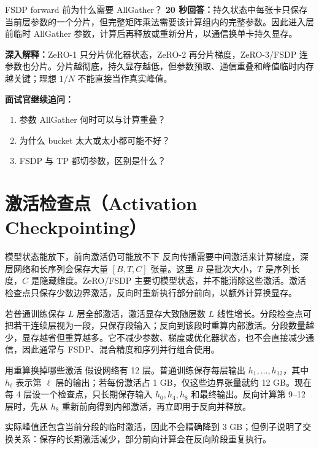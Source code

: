 \begin{interviewbox}{FSDP forward 前为什么需要 AllGather？}
\textbf{20 秒回答：}持久状态中每张卡只保存当前层参数的一个分片，但完整矩阵乘法需要该计算组内的完整参数。因此进入层前临时 AllGather 参数，计算后再释放或重新分片，以通信换单卡持久显存。

\textbf{深入解释：}ZeRO-1 只分片优化器状态，ZeRO-2 再分片梯度，ZeRO-3/FSDP 连参数也分片。分片越彻底，持久显存越低，但参数预取、通信重叠和峰值临时内存越关键；理想 $1/N$ 不能直接当作真实峰值。

\textbf{面试官继续追问：}
\begin{enumerate}
  \item 参数 AllGather 何时可以与计算重叠？
  \item 为什么 bucket 太大或太小都可能不好？
  \item FSDP 与 TP 都切参数，区别是什么？
\end{enumerate}
\end{interviewbox}

\section{激活检查点（Activation Checkpointing）}

\begin{motivationbox}{模型状态能放下，前向激活仍可能放不下}
反向传播需要中间激活来计算梯度，深层网络和长序列会保存大量 $[B,T,C]$ 张量。这里 $B$ 是批次大小，$T$ 是序列长度，$C$ 是隐藏维度。ZeRO/FSDP 主要切模型状态，并不能消除这些激活。激活检查点只保存少数边界激活，反向时重新执行部分前向，以额外计算换显存。
\end{motivationbox}

若普通训练保存 $L$ 层全部激活，激活显存大致随层数 $L$ 线性增长。分段检查点可把若干连续层视为一段，只保存段输入；反向到该段时重算内部激活。分段数量越少，显存越省但重算越多。它不减少参数、梯度或优化器状态，也不会直接减少通信，因此通常与 FSDP、混合精度和序列并行组合使用。

\begin{examplebox}{用重算换掉哪些激活}
假设网络有 12 层。普通训练保存每层输出 $h_1,\ldots,h_{12}$，其中 $h_\ell$ 表示第 $\ell$ 层的输出；若每份激活占 1 GB，仅这些边界张量就约 12 GB。现在每 4 层设一个检查点，只长期保存输入 $h_0,h_4,h_8$ 和最终输出。反向计算第 9--12 层时，先从 $h_8$ 重新前向得到内部激活，再立即用于反向并释放。

实际峰值还包含当前分段的临时激活，因此不会精确降到 3 GB；但例子说明了交换关系：保存的长期激活减少，部分前向计算会在反向阶段重复执行。
\end{examplebox}

